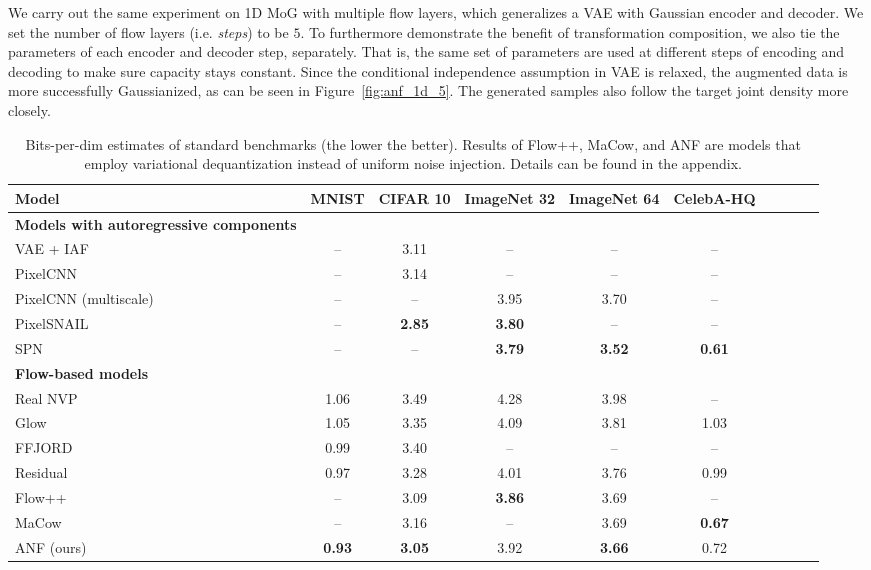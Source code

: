 \documentclass{article}
\begin{document}
We carry out the same experiment on 1D MoG with multiple flow layers, which generalizes a VAE with Gaussian encoder and decoder. 
We set the number of flow layers (i.e. \emph{steps}) to be $5$.
To furthermore demonstrate the benefit of transformation composition, we also tie the parameters of each encoder and decoder step, separately.  
That is, the same set of parameters are used at different steps of encoding and decoding to make sure capacity stays constant. 
Since the conditional independence assumption in VAE is relaxed,
the augmented data is more successfully Gaussianized, as can be seen in Figure~\ref{fig:anf_1d_5}. The generated samples also follow the target joint density more closely. 



\begin{table*}[ht]
\centering
\small
\begin{tabular}{lccccccccc} 
\toprule
{\bf Model} & {\bf MNIST} & {\bf CIFAR 10} & {\bf ImageNet 32} & {\bf ImageNet 64} & {\bf CelebA-HQ} \\ 
\midrule 
\textbf{\small Models with autoregressive components} \\
{VAE + IAF {\small \citep{kingma2016improved}}} & {--} & 3.11 & {--} & {--} & {--}\\
{PixelCNN {\small \citep{oord2016pixel}}} & {--} & 3.14 & {--} & {--} & {--}\\
{PixelCNN (multiscale) {\small \citep{reed2017parallel}}} & {--} & {--} & 3.95 & 3.70 & {--}\\
{PixelSNAIL {\small \citep{chen2017pixelsnail}}} & {--} & \textbf{2.85} & \textbf{3.80} & {--} & {--} \\
{SPN {\small \citep{menick2018generating}}} & {--} & {--} & \textbf{3.79} & \textbf{3.52} & \textbf{0.61}\\
\midrule
\textbf{\small Flow-based models} \\
{Real NVP {\small \citep{dinh2016density}}}  & 1.06 & 3.49 & 4.28 & 3.98 & {--} \\
{Glow {\small \citep{kingma2018glow}}}  &  1.05 & 3.35 & 4.09 & 3.81 & 1.03 \\
{FFJORD {\small \citep{grathwohl2018ffjord}}}  & 0.99 & 3.40 & {--} & {--} & {--} \\
{Residual {\small \citep{chen2019residualflows}}}  & 0.97 & 3.28 & 4.01 & 3.76 & 0.99 \\
{Flow++ {\small \citep{ho2019flow++}}}  & {--} & 3.09 & \textbf{3.86} & 3.69 & {--} \\
{MaCow {\small \citep{ma2019macow}}} & {--} & 3.16 & {--} & 3.69 & \textbf{0.67} \\
\midrule
{ANF (ours)} & \textbf{0.93} & \textbf{3.05} & 3.92 & \textbf{3.66} & 0.72\\
\bottomrule
\end{tabular}
\caption{\small Bits-per-dim estimates of standard benchmarks (the lower the better).
Results of Flow++, MaCow, and ANF are models that employ variational dequantization instead of uniform noise injection. Details can be found in the appendix. 
}
\label{tab:density}
\end{table*}
\end{document}
